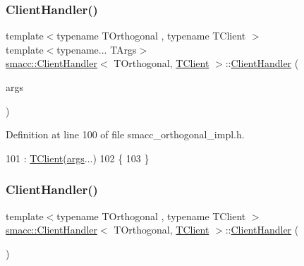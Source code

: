 \subsubsection{\texorpdfstring{Client\+Handler()}{ClientHandler()}\hspace{0.1cm}{\footnotesize\ttfamily [1/2]}}
{\footnotesize\ttfamily template$<$typename T\+Orthogonal , typename T\+Client $>$ \\
template$<$typename... T\+Args$>$ \\
\hyperlink{classsmacc_1_1ClientHandler}{smacc\+::\+Client\+Handler}$<$ T\+Orthogonal, \hyperlink{classTClient}{T\+Client} $>$\+::\hyperlink{classsmacc_1_1ClientHandler}{Client\+Handler} (\begin{DoxyParamCaption}\item[{T\+Args...}]{args }\end{DoxyParamCaption})\hspace{0.3cm}{\ttfamily [inline]}}



Definition at line 100 of file smacc\+\_\+orthogonal\+\_\+impl.\+h.


\begin{DoxyCode}
101         : \hyperlink{classTClient}{TClient}(\hyperlink{namespacegenerate__debs_a75f9143e38df82d83b2e8a6f99cae02c}{args}...)
102     \{
103     \}
\end{DoxyCode}
\mbox{\label{classsmacc_1_1ClientHandler_a73f354900b489edacad7ccb411c272da}} 
\subsubsection{\texorpdfstring{Client\+Handler()}{ClientHandler()}\hspace{0.1cm}{\footnotesize\ttfamily [2/2]}}
{\footnotesize\ttfamily template$<$typename T\+Orthogonal , typename T\+Client $>$ \\
\hyperlink{classsmacc_1_1ClientHandler}{smacc\+::\+Client\+Handler}$<$ T\+Orthogonal, \hyperlink{classTClient}{T\+Client} $>$\+::\hyperlink{classsmacc_1_1ClientHandler}{Client\+Handler} (\begin{DoxyParamCaption}{ }\end{DoxyParamCaption})\hspace{0.3cm}{\ttfamily [inline]}}



